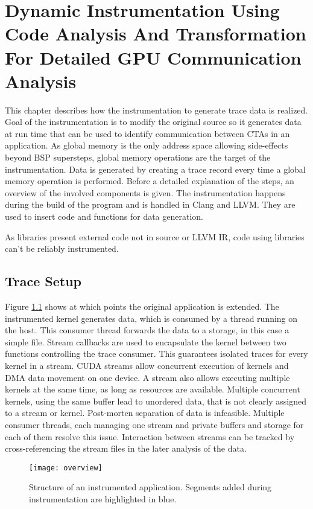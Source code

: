 \chapter{Dynamic Instrumentation Using Code Analysis And Transformation For Detailed GPU Communication Analysis}\label{chap:impl}
This chapter describes how the instrumentation to generate trace data is realized. Goal of the instrumentation is to modify the original source so it generates data at run time that can be used to identify communication between CTAs in an application. As global memory is the only address space allowing side-effects beyond BSP supersteps, global memory operations are the target of the instrumentation. Data is generated by creating a trace record every time a global memory operation is performed.  Before a detailed explanation of the steps, an overview of the involved components is given. The instrumentation happens during the build of the program and is handled in Clang and LLVM. They are used to insert code and functions for data generation.

As libraries present external code not in source or LLVM IR, code using libraries can't be reliably instrumented.

\section{Trace Setup}
Figure \ref{overview} shows at which points the original application is extended. The instrumented kernel generates data, which is consumed by a thread running on the host. This consumer thread forwards the data to a 
storage, in this case a simple file. Stream callbacks are used to encapsulate the kernel
between two functions controlling the trace consumer. This guarantees isolated traces for every kernel in a stream.
CUDA streams allow concurrent execution of kernels and DMA data movement on one device.
A stream also allows executing multiple kernels at the same time, as long as resources are available. Multiple concurrent kernels, using the same buffer lead to unordered data, that is not clearly assigned to a stream or kernel. Post-morten separation of data is infeasible. Multiple consumer threads, each managing one stream and private buffers and storage for each of them resolve this issue. Interaction between streams can be tracked by cross-referencing the stream files in the later analysis of the data.
\begin{figure}[t]
	\centering
	\texttt{[image: overview]}
	\caption{Structure of an instrumented application. Segments added during instrumentation are highlighted in blue.}
	\label{overview}
\end{figure}


